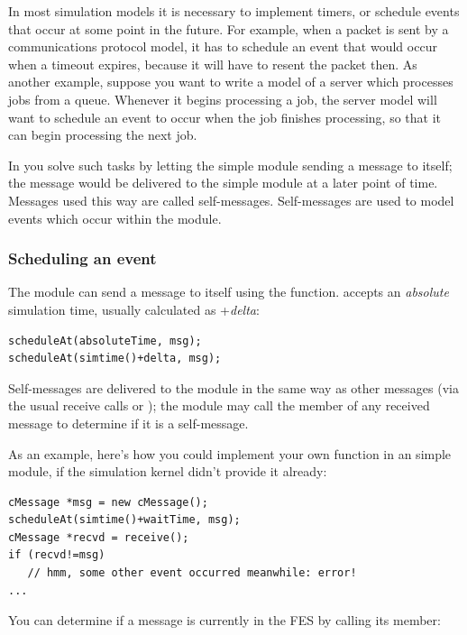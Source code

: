 In most simulation models it is necessary to implement timers,
or schedule events that occur at some point in the future.
For example, when a packet is sent by a communications protocol model,
it has to schedule an event that would occur when a timeout expires,
because it will have to resent the packet then.
As another example, suppose you want to write a model of a server which
processes jobs from a queue. Whenever it begins processing
a job, the server model will want to schedule an event to occur
when the job finishes processing, so that it can begin processing
the next job.

In {\opp} you solve such tasks by letting the simple module
sending a message to itself; the message would be delivered
to the simple module at a later point of time. Messages used
this way are called self-messages.
Self-messages are used to model events which occur within the module.

\subsubsection{Scheduling an event}

The module can send a message to itself using the  function.
 accepts an \textit{absolute} simulation time,
usually calculated as +\textit{delta}:

\begin{verbatim}
scheduleAt(absoluteTime, msg);
scheduleAt(simtime()+delta, msg);
\end{verbatim}

Self-messages are delivered to the module in the same way as other
messages (via the usual receive calls or );
the module may call the  member of any received
message to determine if it is a self-message.

As an example, here's how you could implement your own 
function in an  simple module, if the simulation kernel
didn't provide it already:

\begin{verbatim}
cMessage *msg = new cMessage();
scheduleAt(simtime()+waitTime, msg);
cMessage *recvd = receive();
if (recvd!=msg)
   // hmm, some other event occurred meanwhile: error!
...
\end{verbatim}

You can determine if a message is currently in the FES
by calling its  member:

